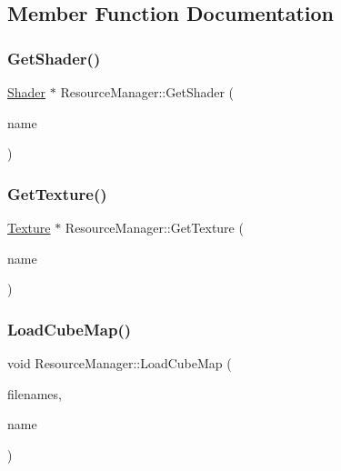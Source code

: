 \subsection{Member Function Documentation}
\mbox{\label{class_resource_manager_ae95ecdc6de1127616485f7d069437332}} 
\subsubsection{\texorpdfstring{GetShader()}{GetShader()}}
{\footnotesize\ttfamily \mbox{\hyperlink{class_shader}{Shader}} $\ast$ Resource\+Manager\+::\+Get\+Shader (\begin{DoxyParamCaption}\item[{std\+::string}]{name }\end{DoxyParamCaption})\hspace{0.3cm}{\ttfamily [static]}}

\mbox{\label{class_resource_manager_aa1456969a733c58bc47f372005699cbc}} 
\subsubsection{\texorpdfstring{GetTexture()}{GetTexture()}}
{\footnotesize\ttfamily \mbox{\hyperlink{class_texture}{Texture}} $\ast$ Resource\+Manager\+::\+Get\+Texture (\begin{DoxyParamCaption}\item[{std\+::string}]{name }\end{DoxyParamCaption})\hspace{0.3cm}{\ttfamily [static]}}

\mbox{\label{class_resource_manager_aa1b2f4a63ed096bbcd1e3732078f35f6}} 
\subsubsection{\texorpdfstring{LoadCubeMap()}{LoadCubeMap()}}
{\footnotesize\ttfamily void Resource\+Manager\+::\+Load\+Cube\+Map (\begin{DoxyParamCaption}\item[{std\+::vector$<$ G\+Lchar $\ast$ $>$}]{filenames,  }\item[{std\+::string}]{name }\end{DoxyParamCaption})\hspace{0.3cm}{\ttfamily [static]}}


